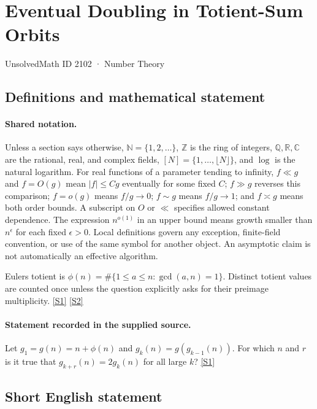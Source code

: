 \documentclass[11pt,a4paper]{article}
\newcommand{\N}{\mathbb{N}}
\newcommand{\Z}{\mathbb{Z}}
\newcommand{\Q}{\mathbb{Q}}
\newcommand{\R}{\mathbb{R}}
\newcommand{\C}{\mathbb{C}}
\newcommand{\sref}[2]{\hyperlink{source:#1:#2}{[S#2]}}
\begin{document}

\setcounter{section}{2101}

\section{Eventual Doubling in Totient-Sum Orbits}\label{2102}

{\small\sffamily UnsolvedMath ID 2102 · Number Theory}

\subsection{Definitions and mathematical statement}

\paragraph{Shared notation.}Unless a section says otherwise, $\N=\{1,2,\ldots\}$,
$\Z$ is the ring of integers, $\Q,\R,\C$ are the rational, real, and complex
fields, $[N]=\{1,\ldots,\lfloor N\rfloor\}$, and $\log$ is the natural
logarithm. For real functions of a parameter tending to infinity,
$f\ll g$ and $f=O(g)$ mean $|f|\leq Cg$ eventually for some fixed $C$;
$f\gg g$ reverses this comparison; $f=o(g)$ means $f/g\to0$;
$f\sim g$ means $f/g\to1$; and $f\asymp g$ means both order bounds.
A subscript on $O$ or $\ll$ specifies allowed constant dependence.
The expression $n^{o(1)}$ in an upper bound means growth smaller than
$n^\epsilon$ for each fixed $\epsilon>0$. Local definitions govern any
exception, finite-field convention, or use of the same symbol for another
object. An asymptotic claim is not automatically an effective algorithm.



Euler\textquotesingle s totient is $\phi(n)=\#\{1\leq a\leq n:\gcd(a,n)=1\}$. Distinct totient values are counted once unless the question explicitly asks for their preimage multiplicity. \sref{2102}{1} \sref{2102}{2}

\paragraph{Statement recorded in the supplied source.}
Let $g_1=g(n)=n+\phi(n)$ and $g_k(n)=g(g_{k-1}(n))$. For which $n$ and $r$ is it true that $g_{k+r}(n)=2g_k(n)$ for all large $k$? \sref{2102}{1}

\subsection{Short English statement}
\end{document}

